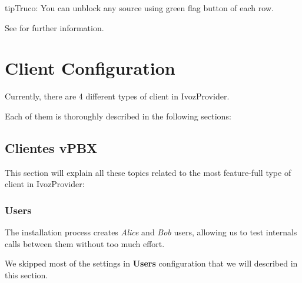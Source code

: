 \documentclass[letterpaper,10pt,spanish]{sphinxmanual}
\begin{document}
\begin{notice}{tip}{Truco:}
You can unblock any source using green flag button of each row.
\end{notice}

See {\hyperref[security_and_maintenance/security/antibruteforce:anti\string-brute\string-force\string-attacks]{}} for further information.


\chapter{Client Configuration}
\label{administration_portal/client/index:client-configuration}\label{administration_portal/client/index::doc}
Currently, there are 4 different types of client in IvozProvider.

Each of them is thoroughly described in the following sections:


\section{Clientes vPBX}
\label{administration_portal/client/vpbx/index:vpbx-clients}\label{administration_portal/client/vpbx/index::doc}
This section will explain all these topics related to the most feature-full type of client in IvozProvider:


\subsection{Users}
\label{administration_portal/client/vpbx/users::doc}\label{administration_portal/client/vpbx/users:users}\label{administration_portal/client/vpbx/users:id1}
The installation process creates \emph{Alice} and \emph{Bob} users, allowing us
to test internals calls between them without too much effort.

We skipped most of the settings in \textbf{Users} configuration that we will described
in this section.
\end{document}
